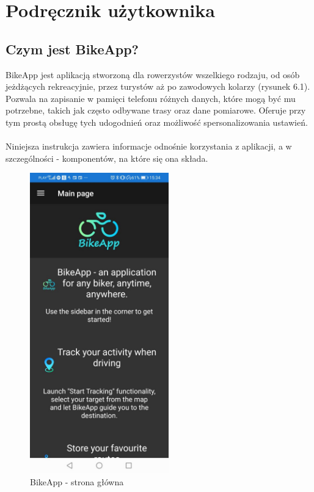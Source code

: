 	\newpage
\section{Podręcznik użytkownika}  %

\subsection{Czym jest BikeApp?} %

BikeApp jest aplikacją stworzoną dla rowerzystów wszelkiego rodzaju, od osób jeżdżących rekreacyjnie, przez turystów aż po zawodowych kolarzy (rysunek 6.1). Pozwala na zapisanie w pamięci telefonu różnych danych, które mogą być mu potrzebne, takich jak często odbywane trasy oraz dane pomiarowe. Oferuje przy tym prostą obsługę tych udogodnień oraz możliwość spersonalizowania ustawień.\\
\\
Niniejsza instrukcja zawiera informacje odnośnie korzystania z aplikacji, a w szczególności - komponentów, na które się ona składa.\\

\begin{figure}[!htb]
	\begin{center}
		\includegraphics[width=6cm]{rys/instructions-mainpage.jpg}
		\caption{BikeApp - strona główna}
		\label{rys:BikeApp - strona główna}
	\end{center}
\end{figure}

